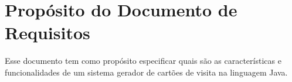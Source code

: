 \section{Propósito do Documento de Requisitos}

Esse documento tem como propósito especificar quais são as características e funcionalidades de um sistema gerador de cartões de visita na linguagem Java.
